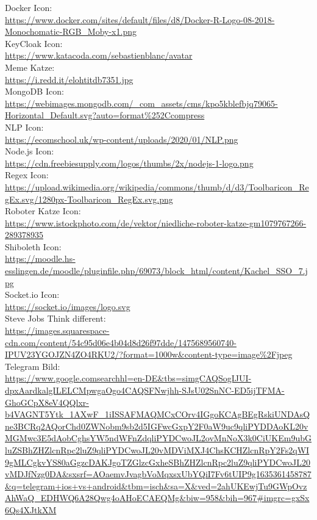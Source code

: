 Docker Icon:\\
\url{https://www.docker.com/sites/default/files/d8/Docker-R-Logo-08-2018-Monochomatic-RGB_Moby-x1.png}\\

KeyCloak Icon:\\
\url{https://www.katacoda.com/sebastienblanc/avatar}\\

Meme Katze:\\
\url{https://i.redd.it/elohtitdb7351.jpg}\\

MongoDB Icon:\\
\url{https://webimages.mongodb.com/_com_assets/cms/kpo5kblefbjq79065-Horizontal_Default.svg?auto=format%252Ccompress}\\

NLP Icon:\\
\url{https://ecomschool.uk/wp-content/uploads/2020/01/NLP.png}\\

Node.js Icon:\\
\url{https://cdn.freebiesupply.com/logos/thumbs/2x/nodejs-1-logo.png}\\

Regex Icon:\\
\url{https://upload.wikimedia.org/wikipedia/commons/thumb/d/d3/Toolbaricon_RegEx.svg/1280px-Toolbaricon_RegEx.svg.png}\\

Roboter Katze Icon:\\
\url{https://www.istockphoto.com/de/vektor/niedliche-roboter-katze-gm1079767266-289378935}\\

Shiboleth Icon:\\
\url{https://moodle.hs-esslingen.de/moodle/pluginfile.php/69073/block_html/content/Kachel_SSO_7.jpg}\\

Socket.io Icon:\\
\url{https://socket.io/images/logo.svg}\\

Steve Jobs Think different:\\
\url{https://images.squarespace-cdn.com/content/54c95d06e4b04d8d26f97dde/1475689560740-IPUV23YGOJZN4ZO4RKU2/?format=1000w&content-type=image%2Fjpeg}\\

Telegram Bild:\\
\url{https://www.google.comsearchhl=en-DE&tbs=simgCAQSogIJUI-dpxAardkalgILELCMpwgaOgo4CAQSFNwjhh-SJsU02SnNC-ED5ijTFMA-GhoGCpX8eV4QQlxr-b4VAGNT5Ytk_1AXwF_1iISSAFMAQMCxCOrv4IGgoKCAgBEgRskiUNDAsQne3BCRq2AQorChd0ZWNobm9sb2d5IGFwcGxpY2F0aW9uc9qliPYDDAoKL20vMGMwc3E5dAobCghsYW5ndWFnZdqliPYDCwoJL2ovMnNoX3k0CiUKEm9ubGluZSBhZHZlcnRpc2luZ9qliPYDCwoJL20vMDViMXJ4ChsKCHZlcnRpY2Fs2qWI9gMLCgkvYS80aGgzcDAKJgoTZGlzcGxheSBhZHZlcnRpc2luZ9qliPYDCwoJL20vMDJfNzg0DA&sxsrf=AOaemvJvagbVoMqxsxUbYQiI7Fv6tUIP9g1635361458787&q=telegram+ios+vs+android&tbm=isch&sa=X&ved=2ahUKEwjTu9GWpOvzAhWaQ_EDHWQ6A28Qwg4oAHoECAEQMg&biw=958&bih=967#imgrc=gxSx6Qs4XJtkXM}\\

